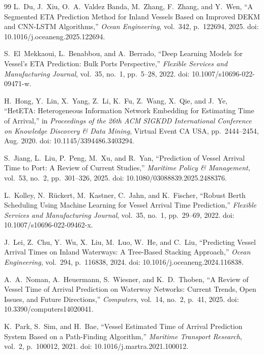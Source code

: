 \documentclass[sigconf,anonymous]{acmart}%
\begin{document}
\begin{thebibliography}{99}
L.~Du, J.~Xiu, O.~A.~Valdez Banda, M.~Zhang, F.~Zhang, and Y.~Wen, ``A Segmented ETA Prediction Method for Inland Vessels Based on Improved DEKM and CNN-LSTM Algorithms,'' \textit{Ocean Engineering}, vol.~342, p.~122694, 2025. doi: 10.1016/j.oceaneng.2025.122694.

S.~El~Mekkaoui, L.~Benabbou, and A.~Berrado, ``Deep Learning Models for Vessel's ETA Prediction: Bulk Ports Perspective,'' \textit{Flexible Services and Manufacturing Journal}, vol.~35, no.~1, pp.~5--28, 2022. doi: 10.1007/s10696-022-09471-w.

H.~Hong, Y.~Lin, X.~Yang, Z.~Li, K.~Fu, Z.~Wang, X.~Qie, and J.~Ye, ``HetETA: Heterogeneous Information Network Embedding for Estimating Time of Arrival,'' in \textit{Proceedings of the 26th ACM SIGKDD International Conference on Knowledge Discovery \& Data Mining}, Virtual Event CA USA, pp.~2444--2454, Aug. 2020. doi: 10.1145/3394486.3403294.

S.~Jiang, L.~Liu, P.~Peng, M.~Xu, and R.~Yan, ``Prediction of Vessel Arrival Time to Port: A Review of Current Studies,'' \textit{Maritime Policy \& Management}, vol.~53, no.~2, pp.~301--326, 2025. doi: 10.1080/03088839.2025.2488376.

L.~Kolley, N.~R{\"u}ckert, M.~Kastner, C.~Jahn, and K.~Fischer, ``Robust Berth Scheduling Using Machine Learning for Vessel Arrival Time Prediction,'' \textit{Flexible Services and Manufacturing Journal}, vol.~35, no.~1, pp.~29--69, 2022. doi: 10.1007/s10696-022-09462-x.

J.~Lei, Z.~Chu, Y.~Wu, X.~Liu, M.~Luo, W.~He, and C.~Liu, ``Predicting Vessel Arrival Times on Inland Waterways: A Tree-Based Stacking Approach,'' \textit{Ocean Engineering}, vol.~294, p.~116838, 2024. doi: 10.1016/j.oceaneng.2024.116838.

A.~A.~Noman, A.~Heuermann, S.~Wiesner, and K.~D.~Thoben, ``A Review of Vessel Time of Arrival Prediction on Waterway Networks: Current Trends, Open Issues, and Future Directions,'' \textit{Computers}, vol.~14, no.~2, p.~41, 2025. doi: 10.3390/computers14020041.

K.~Park, S.~Sim, and H.~Bae, ``Vessel Estimated Time of Arrival Prediction System Based on a Path-Finding Algorithm,'' \textit{Maritime Transport Research}, vol.~2, p.~100012, 2021. doi: 10.1016/j.martra.2021.100012.


\end{thebibliography}
\end{document}
